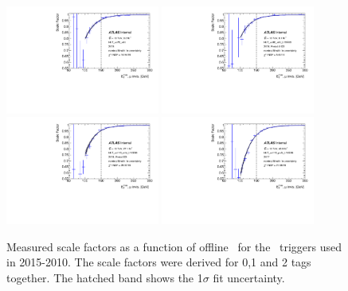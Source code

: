 \begin{figure}[tb!]
	\centering
	\includegraphics[width=0.45\textwidth]{chapters/c6/fig/METTriggerCalibration/SF_HLT_xe70_mht.pdf}
	\includegraphics[width=0.45\textwidth]{chapters/c6/fig/METTriggerCalibration/SF_HLT_xe90_mht_L1XE50.pdf}
	\includegraphics[width=0.45\textwidth]{chapters/c6/fig/METTriggerCalibration/SF_HLT_xe110_mht_L1XE50.pdf}
	\includegraphics[width=0.45\textwidth]{chapters/c6/fig/METTriggerCalibration/SF_HLT_xe110_pufit_L1XE55.pdf}
	\caption{Measured scale factors as a function of offline \METnomu~for the \MET~triggers used in 2015-2010. The scale factors were derived for 0,1 and 2 tags together. The hatched band shows the 1$\sigma$ fit uncertainty.}
	\label{fig:TrigSF}
\end{figure}

